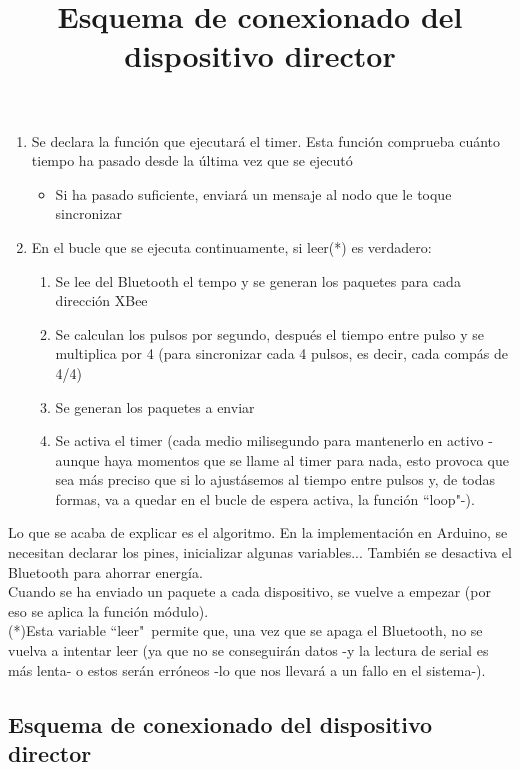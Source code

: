   \begin{enumerate}
  \item Se declara la función que ejecutará el timer. Esta función comprueba cuánto
   tiempo ha pasado desde la última vez que se ejecutó
    \begin{itemize}
      \item Si ha pasado suficiente, enviará un mensaje al nodo que le toque sincronizar
    \end{itemize}
  \item En el bucle que se ejecuta continuamente, si leer(*) es verdadero:
    \begin{enumerate}
      \item Se lee del Bluetooth el tempo y se generan los paquetes para cada dirección XBee
      \item Se calculan los pulsos por segundo, después el tiempo entre pulso y se multiplica
      por 4 (para sincronizar cada 4 pulsos, es decir, cada compás de 4/4)
      \item Se generan los paquetes a enviar
      \item Se activa el timer (cada medio milisegundo para mantenerlo en activo -aunque haya momentos que se llame
      al timer para nada, esto provoca que sea más preciso que si lo ajustásemos al tiempo entre pulsos y, de todas formas,
      va a quedar en el bucle de espera activa, la función ``loop"-).
    \end{enumerate}
\end{enumerate}

Lo que se acaba de explicar es el algoritmo. En la implementación en Arduino, se necesitan
declarar los pines, inicializar algunas variables... También se desactiva el Bluetooth para
ahorrar energía.\\

Cuando se ha enviado un paquete a cada dispositivo, se vuelve a empezar (por eso se aplica la función módulo).\\

(*)Esta variable ``leer"\ permite que, una vez que se apaga el Bluetooth, no se vuelva a intentar leer
(ya que no se conseguirán datos -y la lectura de serial es más lenta- o estos serán erróneos
-lo que nos llevará a un fallo en el sistema-).\\


\subsection{Esquema de conexionado del dispositivo director}
\title{Esquema de conexionado del dispositivo director}

